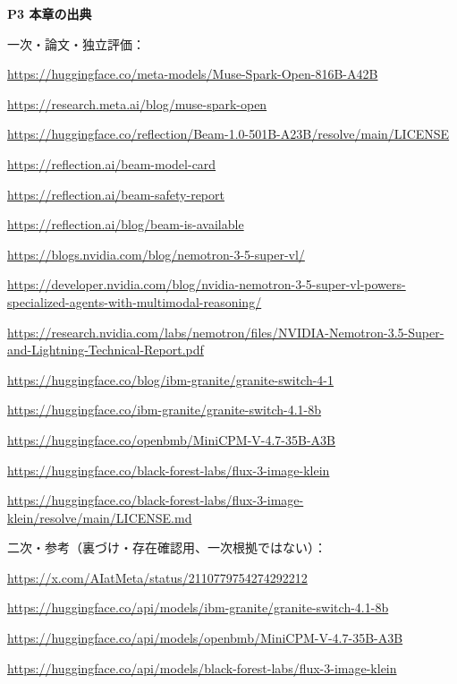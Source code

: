 \documentclass[lualatex,a4paper,10pt]{jlreq}
\begin{document}
\begin{tcolorbox}[colback=white,colframe=SurveyRule,arc=1mm,boxrule=0.4pt,left=2mm,right=2mm]
\textbf{P3 本章の出典}\par\footnotesize
一次・論文・独立評価：\par
[B13] \url{https://huggingface.co/meta-models/Muse-Spark-Open-816B-A42B}\par
[B14] \url{https://research.meta.ai/blog/muse-spark-open}\par
[B16] \url{https://huggingface.co/reflection/Beam-1.0-501B-A23B/resolve/main/LICENSE}\par
[B17] \url{https://reflection.ai/beam-model-card}\par
[B18] \url{https://reflection.ai/beam-safety-report}\par
[B19] \url{https://reflection.ai/blog/beam-is-available}\par
[B20] \url{https://blogs.nvidia.com/blog/nemotron-3-5-super-vl/}\par
[B21] \url{https://developer.nvidia.com/blog/nvidia-nemotron-3-5-super-vl-powers-specialized-agents-with-multimodal-reasoning/}\par
[B22] \url{https://research.nvidia.com/labs/nemotron/files/NVIDIA-Nemotron-3.5-Super-and-Lightning-Technical-Report.pdf}\par
[B24] \url{https://huggingface.co/blog/ibm-granite/granite-switch-4-1}\par
[B25] \url{https://huggingface.co/ibm-granite/granite-switch-4.1-8b}\par
[B27] \url{https://huggingface.co/openbmb/MiniCPM-V-4.7-35B-A3B}\par
[B29] \url{https://huggingface.co/black-forest-labs/flux-3-image-klein}\par
[B30] \url{https://huggingface.co/black-forest-labs/flux-3-image-klein/resolve/main/LICENSE.md}\par
二次・参考（裏づけ・存在確認用、一次根拠ではない）：\par
[B15] \url{https://x.com/AIatMeta/status/2110779754274292212}\par
[B23] \url{https://huggingface.co/api/models/ibm-granite/granite-switch-4.1-8b}\par
[B26] \url{https://huggingface.co/api/models/openbmb/MiniCPM-V-4.7-35B-A3B}\par
[B28] \url{https://huggingface.co/api/models/black-forest-labs/flux-3-image-klein}\par
\end{tcolorbox}
\end{document}

